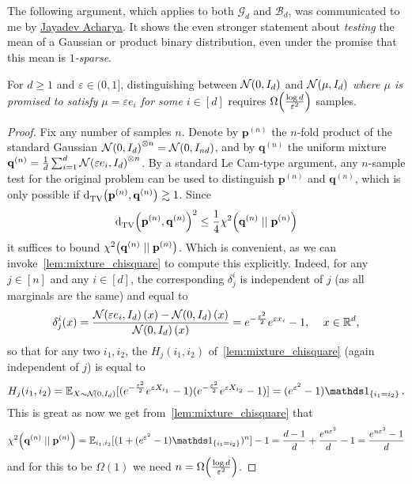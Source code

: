 \documentclass[10pt]{article}
\newcommand{\dst}{\varepsilon}
\newcommand{\ns}{n}
\newcommand{\dims}{d}
\newcommand{\p}{\mathbf{p}}
\newcommand{\q}{\mathbf{q}}
\begin{document}
The following argument, which applies to both $\mathcal{G}_\dims$ and $\mathcal{B}_\dims$, was communicated to me by \href{https://people.ece.cornell.edu/acharya/}{Jayadev Acharya}. It shows the even stronger statement about \emph{testing} the mean of a Gaussian or product binary distribution, even under the promise that this mean is \emph{$1$-sparse}.
\begin{lemma}
  \label{lemma:hs:gaussian}
  For $\dims\geq 1$ and $\dst\in(0,1]$, distinguishing between $\gaussian{0}{I_\dims}$ and $\gaussian{\mu}{I_\dims}$ \emph{where $\mu$ is promised to satisfy $\mu=\dst e_i$ for some $i\in[\dims]$} requires $\bigOmega{\frac{\log\dims}{\dst^2}}$ samples.
\end{lemma}
\begin{proof}
  Fix any number of samples $\ns$. Denote by $\p^{(\ns)}$ the $\ns$-fold product of the standard Gaussian $\gaussian{0}{I_\dims}^{\otimes \ns} = \gaussian{0}{I_{\ns\dims}}$, and by $\q^{(\ns)}$ the uniform mixture $\q^{(\ns)} = \frac{1}{\dims}\sum_{i=1}^\dims \gaussian{\dst e_i}{I_\dims}^{\otimes \ns}$.  By a standard Le Cam-type argument, any $\ns$-sample test for the original problem can be used to distinguish $\p^{(\ns)}$ and $\q^{(\ns)}$, which is only possible if $\totalvardist{\p^{(\ns)}}{\q^{(\ns)}} \gtrsim 1$. Since
  \[
      \totalvardist{\p^{(\ns)}}{\q^{(\ns)}}^2 \leq \frac{1}{4}\chisquare{\q^{(\ns)}}{\p^{(\ns)}}
  \]
  it suffices to bound $\chisquare{\q^{(\ns)}}{\p^{(\ns)}}$. Which is convenient, as we can invoke~\autoref{lem:mixture_chisquare} to compute this explicitly. Indeed, for any $j\in[\ns]$ and any $i\in[\dims]$, the corresponding $\delta_j^i$ is independent of $j$ (as all marginals are the same) and equal to
  \[
      \delta_j^i(x) = \frac{\gaussian{\dst e_i}{I_\dims}(x)-\gaussian{0}{I_\dims}(x)}{\gaussian{0}{I_\dims}(x)} = e^{-\frac{\dst^2}{2}}e^{\dst x_i}-1,\,\quad x\in\R^\dims,
  \]
  so that for any two $i_1,i_2$, the $H_j(i_1,i_2)$ of~\autoref{lem:mixture_chisquare} (again independent of $j$) is equal to
  \[
      H_j(i_1,i_2) = \shortexpect_{X\sim\gaussian{0}{I_\dims}}[ (e^{-\frac{\dst^2}{2}}e^{\dst X_{i_1}}-1)(e^{-\frac{\dst^2}{2}}e^{\dst X_{i_2}}-1) ] = (e^{\dst^2}-1)\indic{i_1=i_2}\,.
  \]
  This is great as now we get from~\autoref{lem:mixture_chisquare} that
  \[
      \chisquare{\q^{(\ns)}}{\p^{(\ns)}} = \shortexpect_{i_1,i_2}[ (1+(e^{\dst^2}-1)\indic{i_1=i_2})^\ns ] -1 = \frac{\dims-1}{\dims}+\frac{e^{\ns\dst^2}}{\dims}-1 = \frac{e^{\ns\dst^2}-1}{\dims}
  \]
  and for this to be $\Omega(1)$ we need $\ns = \bigOmega{\frac{\log\dims}{\dst^2}}$.
\end{proof}
\end{document}
